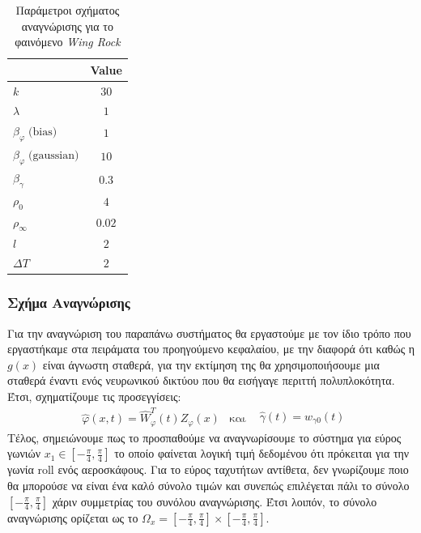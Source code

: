 {\begin{table}
		\centering
		\captionsetup{format=plain}
		\begin{tabular}{ l | c }
			\hline\hline
			\text{Parameter} & Value \\ \hline\hline
			$k$             & $30$   \\ \hline
			$\lambda$       & $1 $   \\ \hline
			$\beta_{\varphi} \;\text{(bias)}$     & $1$ \\ \hline
			$\beta_{\varphi} \;\text{(gaussian)}$ & $10$ \\ \hline
			$\beta_{\gamma}$ & $0.3$  \\ \hline
			$\rho_0      $ & $4$  \\ \hline
			$\rho_\infty $ & $0.02$  \\ \hline
			$l           $ & $2$  \\ \hline
			$\textit{ΔΤ} $  & $2$ 	\\ \hline \hline	
		\end{tabular}
		\caption{Παράμετροι σχήματος αναγνώρισης για το φαινόμενο \textit{Wing Rock}}
		\label{tab:wing_rock_schema_params}
	\end{table}
	
	\subsubsection{Σχήμα Αναγνώρισης}
	Για την αναγνώριση του παραπάνω συστήματος θα εργαστούμε με τον ίδιο τρόπο που εργαστήκαμε στα πειράματα του προηγούμενο κεφαλαίου, με την διαφορά ότι καθώς η $g(x)$ είναι άγνωστη σταθερά, για την εκτίμηση της θα χρησιμοποιήσουμε μια σταθερά έναντι ενός νευρωνικού δικτύου που θα εισήγαγε περιττή πολυπλοκότητα. Έτσι, σχηματίζουμε τις προσεγγίσεις:
	\begin{equation*}
	\begin{matrix}
	\hat{\varphi}(x,t)  = \hat{W}_{\varphi}^T(t) Z_\varphi(x) & \text{και} &  
	\end{matrix}\hat{\gamma}(t) = w_{\gamma 0}(t)
	\end{equation*}
	Τέλος, σημειώνουμε πως το προσπαθούμε να αναγνωρίσουμε το σύστημα για εύρος γωνιών $x_1 \in [-\frac{\pi}{4},\frac{\pi}{4}]$ το οποίο φαίνεται λογική τιμή δεδομένου ότι πρόκειται για την γωνία roll ενός αεροσκάφους. Για το εύρος ταχυτήτων αντίθετα, δεν γνωρίζουμε ποιο θα μπορούσε να είναι ένα καλό σύνολο τιμών και συνεπώς επιλέγεται πάλι το σύνολο \\ $[-\frac{\pi}{4},\frac{\pi}{4}]$ χάριν συμμετρίας του συνόλου αναγνώρισης. Έτσι λοιπόν, το σύνολο αναγνώρισης ορίζεται ως το $\Omega_x = [-\frac{\pi}{4},\frac{\pi}{4}] \times [-\frac{\pi}{4},\frac{\pi}{4}]$.
	
	}

